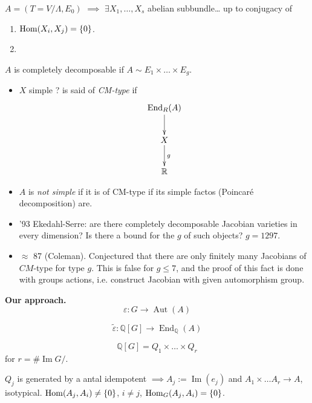 \medskip\noindent

\begin{theorem}
\label{theorem-poincare-irreduc}
$A=(T=V/\Lambda,E_0)$ $\implies $
$\exists X_1,…,X_s$ abelian
subbundle… up to conjugacy of
\begin{enumerate}
\item $\mathop{\mathrm{Hom}}\nolimits(X_i,X_j) = \{0\}$.
\item 
\end{enumerate}
\end{theorem}

\begin{definition}
\label{definition-completely-decomposable}
$A$ is completely decomposable if
$A \sim E_1\times… \times E_g$.
\end{definition}

\begin{itemize}
\item $X$ simple ? is said of {\it CM-type} 
if
$$
\xymatrix{
\operatorname{End}_R(A) \ar[d]\\
X\ar[d]^g\\
\mathbb{R}
}
$$
\item  $A$ is {\it not simple} if
it is of CM-type if its simple factos
(Poincaré decomposition) are.
\end{itemize}

\medskip\noindent
\begin{itemize}
\item '93 Ekedahl-Serre:
are there completely decomposable Jacobian
varieties in every dimension?
Is there a bound for the $g$ of such
objects? $g = 1297$.

\item $\approx$ 87 (Coleman). Conjectured
that there are only finitely many Jacobians
of $CM$-type for type $g$. This is false for
$g \leq 7$, and the proof of this fact
is done with groups actions, i.e. construct
Jacobian with given automorphism group.
\end{itemize}

\medskip\noindent
{\bf Our approach.}
$$
\varepsilon:G \to \operatorname{Aut}(A)
$$

$$
\tilde{\varepsilon}:
\mathbb{Q}[G] \to
\operatorname{End}_{\mathbb{Q}}(A)
$$

$$
\mathbb{Q}[G] = Q_1 \times … \times Q_r
$$
for $r= \#\operatorname{Im}G/$.

$Q_j$ is generated by a antal idempotent
$\implies A_j := \operatorname{Im}(e_j)$
and $A_1 \times … A_r \to A$,
isotypical.
$\mathop{\mathrm{Hom}}\nolimits(A_j,A_i) \neq  \{ 0\}$,
$i \neq  j$,
$\mathop{\mathrm{Hom}}\nolimits_G(A_j,A_i) = \{0\}$.

